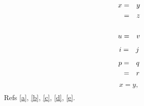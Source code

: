 \documentclass{article}
\begin{document}
\begin{eqnarray}
\label{a} x &=& y \cr
 &=& z \cr
&&\\
u &=& v \label{b}\cr
\end{eqnarray}
\begin{eqnarray}
i &=& j \label{c} \cr
\end{eqnarray}
\begin{eqnarray}
p &=& q \cr
 &=& r \label{d}\cr
\end{eqnarray}
\begin{eqnarray}\label{e}
x = y, \nonumber\\
\end{eqnarray}
Refs \ref{a}, \ref{b}, \ref{c}, \ref{d}, \ref{e}.
\end{document}
